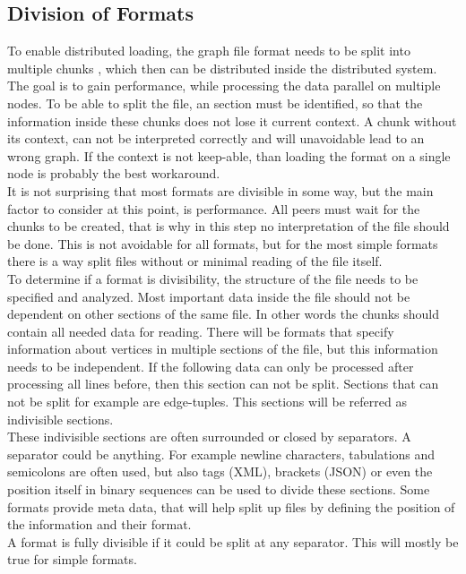 \subsection{Division of Formats}
To enable distributed loading, the graph file format needs to be split into multiple chunks \cite{parallelGraphLoading.10}, which then can be distributed inside the distributed system. The goal is to gain performance, while processing the data parallel on multiple nodes. To be able to split the file, an section must be identified, so that the information inside these chunks does not lose it current context. A chunk without its context, can not be interpreted correctly and will unavoidable lead to an wrong graph. If the context is not keep-able, than loading the format on a single node is probably the best workaround.\\
It is not surprising that most formats are divisible in some way, but the main factor to consider at this point, is performance. All peers must wait for the chunks to be created, that is why in this step no interpretation of the file should be done. This is not avoidable for all formats, but for the most simple formats there is a way split files without or minimal reading of the file itself.\\
To determine if a format is divisibility, the structure of the file needs to be specified and analyzed. Most important data inside the file should not be dependent on other sections of the same file. In other words the chunks should contain all needed data for reading. 
There will be formats that specify information about vertices in multiple sections of the file, but this information needs to be independent. If the following data can only be processed after processing all lines before, then this section can not be split. Sections that can not be split for example are edge-tuples. This sections will be referred as indivisible sections.\\
These indivisible sections are often surrounded or closed by separators. A separator could be anything. For example newline characters, tabulations and  semicolons are often used, but also tags (XML), brackets (JSON) or even the position itself in binary sequences can be used to divide these sections. Some formats provide meta data, that will help split up files by defining the position of the information and their format.\\
A format is fully divisible if it could be split at any separator. This will mostly be true for simple formats.

